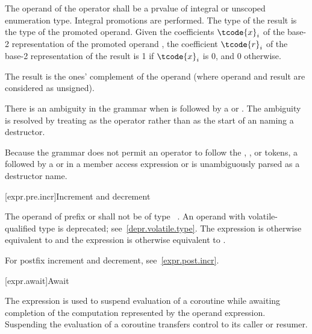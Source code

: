 \pnum
{}%
The operand of the \tcode{\~{}} operator shall be a prvalue of
integral or unscoped enumeration type.
Integral promotions are performed.
The type of the result is the type of the promoted operand.
Given the coefficients $\tcode{x}_i$
of the base-2 representation
of the promoted operand ,
the coefficient $\tcode{r}_i$
of the base-2 representation of the result 
is 1 if $\tcode{x}_i$ is 0, and 0 otherwise.
\begin{note}
The result is the ones' complement of the operand
(where operand and result are considered as unsigned).
\end{note}
There is an ambiguity
in the grammar when \tcode{\~{}} is followed by
a  or .
The ambiguity is resolved by treating \tcode{\~{}} as the
operator rather than as the start of an 
naming a destructor.
\begin{note}
Because the grammar does not permit an operator to follow the
, \tcode{->}, or \tcode{::} tokens, a \tcode{\~{}} followed by
a  or  in a
member access expression or  is
unambiguously parsed as a destructor name.
\end{note}

[expr.pre.incr]{Increment and decrement}

\pnum
{}%
%
%
%
%
%
The operand of prefix \tcode{++} or \tcode{--}
shall not be of type \cv{}~.
An operand with volatile-qualified type is deprecated;
see~\ref{depr.volatile.type}.
The expression  is otherwise equivalent to  and
the expression  is otherwise equivalent to .
\begin{note}
For postfix increment and decrement, see~\ref{expr.post.incr}.
\end{note}

[expr.await]{Await}
%
%

\pnum
The  expression is used to suspend evaluation of a
coroutine while awaiting completion of
the computation represented by the operand expression.
Suspending the evaluation of a coroutine
transfers control to its caller or resumer.

